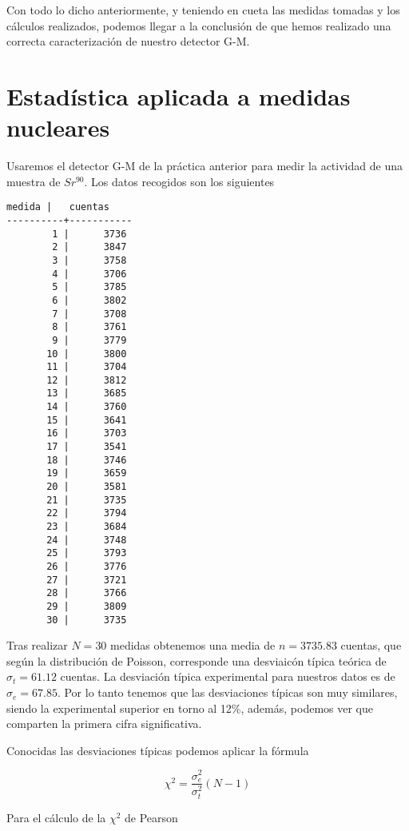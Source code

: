 \documentclass[11pt]{article}
\begin{document}
Con todo lo dicho anteriormente, y teniendo en cueta las medidas tomadas
y los cálculos realizados, podemos llegar a la conclusión de que hemos
realizado una correcta caracterización de nuestro detector G-M.

    \hypertarget{estaduxedstica-aplicada-a-medidas-nucleares}{%
\section{Estadística aplicada a medidas
nucleares}\label{estaduxedstica-aplicada-a-medidas-nucleares}}

Usaremos el detector G-M de la práctica anterior para medir la actividad
de una muestra de \(Sr^{90}\). Los datos recogidos son los siguientes

    \begin{Verbatim}[commandchars=\\\{\}]
   medida |   cuentas
----------+-----------
        1 |      3736
        2 |      3847
        3 |      3758
        4 |      3706
        5 |      3785
        6 |      3802
        7 |      3708
        8 |      3761
        9 |      3779
       10 |      3800
       11 |      3704
       12 |      3812
       13 |      3685
       14 |      3760
       15 |      3641
       16 |      3703
       17 |      3541
       18 |      3746
       19 |      3659
       20 |      3581
       21 |      3735
       22 |      3794
       23 |      3684
       24 |      3748
       25 |      3793
       26 |      3776
       27 |      3721
       28 |      3766
       29 |      3809
       30 |      3735
    \end{Verbatim}
 
            
    
    Tras realizar \(N=30\) medidas obtenemos una media de \(n=3735.83\)
cuentas, que según la distribución de Poisson, corresponde una
desviaicón típica teórica de \(\sigma_t = 61.12\) cuentas. La desviación
típica experimental para nuestros datos es de \(\sigma_e = 67.85\). Por
lo tanto tenemos que las desviaciones típicas son muy similares, siendo
la experimental superior en torno al 12\%, además, podemos ver que
comparten la primera cifra significativa.

    

    Conocidas las desviaciones típicas podemos aplicar la fórmula

\[
\chi^2 = \frac{\sigma_e^2}{\sigma_t^2}(N-1)
\]

Para el cálculo de la \(\chi^2\) de Pearson
 
\end{document}
